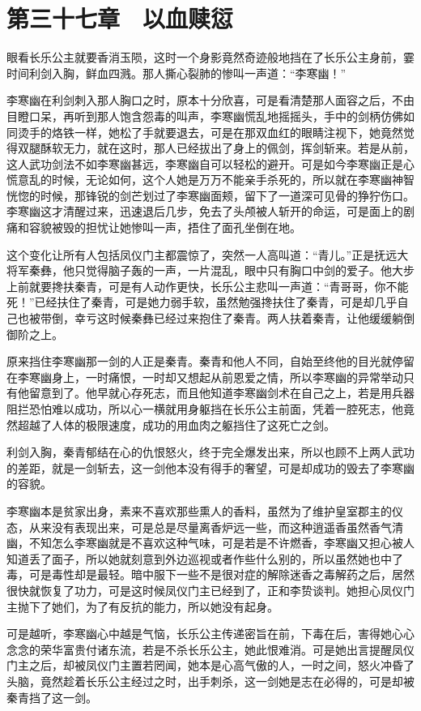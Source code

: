 \chapter{第三十七章　以血赎愆}

眼看长乐公主就要香消玉陨，这时一个身影竟然奇迹般地挡在了长乐公主身前，霎时间利剑入胸，鲜血四溅。那人撕心裂肺的惨叫一声道：“李寒幽！”

李寒幽在利剑刺入那人胸口之时，原本十分欣喜，可是看清楚那人面容之后，不由目瞪口呆，再听到那人饱含怨毒的叫声，李寒幽慌乱地摇摇头，手中的剑柄仿佛如同烫手的烙铁一样，她松了手就要退去，可是在那双血红的眼睛注视下，她竟然觉得双腿酥软无力，就在这时，那人已经拔出了身上的佩剑，挥剑斩来。若是从前，这人武功剑法不如李寒幽甚远，李寒幽自可以轻松的避开。可是如今李寒幽正是心慌意乱的时候，无论如何，这个人她是万万不能亲手杀死的，所以就在李寒幽神智恍惚的时候，那锋锐的剑芒划过了李寒幽面颊，留下了一道深可见骨的狰狞伤口。李寒幽这才清醒过来，迅速退后几步，免去了头颅被人斩开的命运，可是面上的剧痛和容貌被毁的担忧让她惨叫一声，捂住了面孔坐倒在地。

这个变化让所有人包括凤仪门主都震惊了，突然一人高叫道：“青儿。”正是抚远大将军秦彝，他只觉得脑子轰的一声，一片混乱，眼中只有胸口中剑的爱子。他大步上前就要搀扶秦青，可是有人动作更快，长乐公主悲叫一声道：“青哥哥，你不能死！”已经扶住了秦青，可是她力弱手软，虽然勉强搀扶住了秦青，可是却几乎自己也被带倒，幸亏这时候秦彝已经过来抱住了秦青。两人扶着秦青，让他缓缓躺倒御阶之上。

原来挡住李寒幽那一剑的人正是秦青。秦青和他人不同，自始至终他的目光就停留在李寒幽身上，一时痛恨，一时却又想起从前恩爱之情，所以李寒幽的异常举动只有他留意到了。他早就心存死志，而且他知道李寒幽剑术在自己之上，若是用兵器阻拦恐怕难以成功，所以心一横就用身躯挡在长乐公主前面，凭着一腔死志，他竟然超越了人体的极限速度，成功的用血肉之躯挡住了这死亡之剑。

利剑入胸，秦青郁结在心的仇恨怒火，终于完全爆发出来，所以也顾不上两人武功的差距，就是一剑斩去，这一剑他本没有得手的奢望，可是却成功的毁去了李寒幽的容貌。

李寒幽本是贫家出身，素来不喜欢那些熏人的香料，虽然为了维护皇室郡主的仪态，从来没有表现出来，可是总是尽量离香炉远一些，而这种逍遥香虽然香气清幽，不知怎么李寒幽就是不喜欢这种气味，可是若是不许燃香，李寒幽又担心被人知道丢了面子，所以她就刻意到外边巡视或者作些什么别的，所以虽然她也中了毒，可是毒性却是最轻。暗中服下一些不是很对症的解除迷香之毒解药之后，居然很快就恢复了功力，可是这时候凤仪门主已经到了，正和李贽谈判。她担心凤仪门主抛下了她们，为了有反抗的能力，所以她没有起身。

可是越听，李寒幽心中越是气恼，长乐公主传递密旨在前，下毒在后，害得她心心念念的荣华富贵付诸东流，若是不杀长乐公主，她此恨难消。可是她出言提醒凤仪门主之后，却被凤仪门主置若罔闻，她本是心高气傲的人，一时之间，怒火冲昏了头脑，竟然趁着长乐公主经过之时，出手刺杀，这一剑她是志在必得的，可是却被秦青挡了这一剑。

